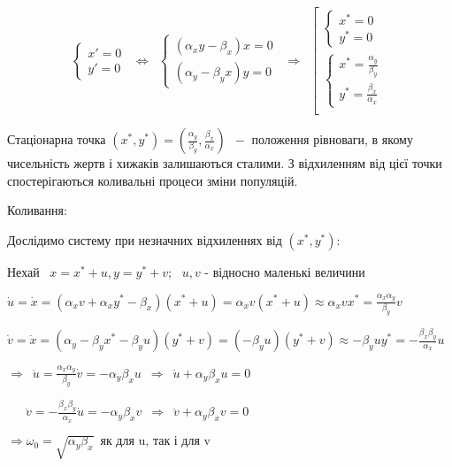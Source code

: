 \documentclass[11pt]{article}
\begin{document}
\[ \left \{\begin{array}{ll}
            x'= 0 \\
            y'= 0
           \end{array}
           \right.  \enspace  \Leftrightarrow \enspace \left \{ \begin{array}{ll}
            (α_x y - β_x)x = 0 \\
            (α_y - β_y x)y = 0
           \end{array}
           \right.  \enspace  \Rightarrow \enspace \left [ \begin{array}{ll}
  \left \{ \begin{array}{ll}
            x^* = 0 \\
            y^* = 0
          \end{array} \right. \\
  \left \{ \begin{array}{ll}
            x^* = \frac{α_y}{β_y}\\
            y^* = \frac{β_x}{α_x}
           \end{array} \right. \\
           \end{array}
           \right. \]

    Стаціонарна точка $ (x^*, y^*) = (\frac{α_y}{β_y},\frac{β_x}{α_x}) \enspace - $ положення рівноваги, в якому чисельність
жертв і хижаків залишаються сталими. З відхиленням від цієї точки
спостерігаються коливальні процеси зміни популяцій.

    Коливання:

Дослідимо систему при незначних відхиленнях від $ (x^*, y^*) $:

Нехай $\enspace x = x^* + u, y = y^* + v $; $ \enspace u,v $ -
відносно маленькі величини

$ \dot{u} =\dot{x}=(α_xv + α_x y^* - β_x) (x^*+u)=α_xv(x^*+u) \approx α_xvx^* = \frac{α_xα_y}{β_y}v $

$ \dot{v} = \dot{x}=(α_y - β_y x^* - β_yu)(y^*+v) = (-β_yu)(y^*+v) \approx - β_yuy^* = - \frac{β_x β_y}{α_x}u $

$ \Rightarrow \enspace \ddot{u} = \frac{α_xα_y}{β_y}\dot{v} = -α_yβ_xu \enspace \Rightarrow \enspace \ddot{u} + α_yβ_xu = 0$

$ \enspace  \enspace \enspace \ddot{v} = - \frac{β_x β_y}{α_x}\dot{u} =- α_yβ_xv \enspace \Rightarrow \enspace \ddot{v} + α_yβ_xv = 0$

$ \Rightarrow \omega_0 = \sqrt{α_yβ_x} \enspace \text{як для u, так і для v}$
\end{document}
